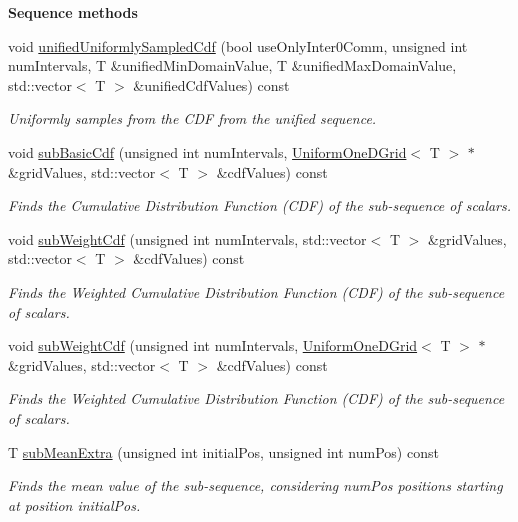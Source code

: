 \begin{Indent}{\bf Sequence methods}
\begin{DoxyCompactItemize}
void \hyperlink{class_q_u_e_s_o_1_1_scalar_sequence_a91a609779409ef7e43f2baa5a21932c0}{unified\-Uniformly\-Sampled\-Cdf} (bool use\-Only\-Inter0\-Comm, unsigned int num\-Intervals, T \&unified\-Min\-Domain\-Value, T \&unified\-Max\-Domain\-Value, std\-::vector$<$ T $>$ \&unified\-Cdf\-Values) const 
\begin{DoxyCompactList}\small\item\em Uniformly samples from the C\-D\-F from the unified sequence. \end{DoxyCompactList}\item 
void \hyperlink{class_q_u_e_s_o_1_1_scalar_sequence_af8278c90236353ce45ea47740cc375d5}{sub\-Basic\-Cdf} (unsigned int num\-Intervals, \hyperlink{class_q_u_e_s_o_1_1_uniform_one_d_grid}{Uniform\-One\-D\-Grid}$<$ T $>$ $\ast$\&grid\-Values, std\-::vector$<$ T $>$ \&cdf\-Values) const 
\begin{DoxyCompactList}\small\item\em Finds the Cumulative Distribution Function (C\-D\-F) of the sub-\/sequence of scalars. \end{DoxyCompactList}\item 
void \hyperlink{class_q_u_e_s_o_1_1_scalar_sequence_aa9af6912c34c5623f35318c61d23f5f2}{sub\-Weight\-Cdf} (unsigned int num\-Intervals, std\-::vector$<$ T $>$ \&grid\-Values, std\-::vector$<$ T $>$ \&cdf\-Values) const 
\begin{DoxyCompactList}\small\item\em Finds the Weighted Cumulative Distribution Function (C\-D\-F) of the sub-\/sequence of scalars. \end{DoxyCompactList}\item 
void \hyperlink{class_q_u_e_s_o_1_1_scalar_sequence_a699acef7aabf58d9633eef02ebfd7110}{sub\-Weight\-Cdf} (unsigned int num\-Intervals, \hyperlink{class_q_u_e_s_o_1_1_uniform_one_d_grid}{Uniform\-One\-D\-Grid}$<$ T $>$ $\ast$\&grid\-Values, std\-::vector$<$ T $>$ \&cdf\-Values) const 
\begin{DoxyCompactList}\small\item\em Finds the Weighted Cumulative Distribution Function (C\-D\-F) of the sub-\/sequence of scalars. \end{DoxyCompactList}\item 
T \hyperlink{class_q_u_e_s_o_1_1_scalar_sequence_a65e9208ee2d0443ad28b29141297153c}{sub\-Mean\-Extra} (unsigned int initial\-Pos, unsigned int num\-Pos) const 
\begin{DoxyCompactList}\small\item\em Finds the mean value of the sub-\/sequence, considering {\ttfamily num\-Pos} positions starting at position {\ttfamily initial\-Pos}. \end{DoxyCompactList}\item 

\end{DoxyCompactItemize}
\end{Indent}
